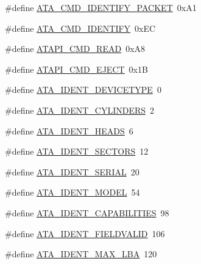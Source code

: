 \begin{DoxyCompactItemize}
\item 
\#define \hyperlink{a00032_acba68da9027d95b9bae53901a8ea009b_acba68da9027d95b9bae53901a8ea009b}{A\+T\+A\+\_\+\+C\+M\+D\+\_\+\+I\+D\+E\+N\+T\+I\+F\+Y\+\_\+\+P\+A\+C\+K\+ET}~0x\+A1
\item 
\#define \hyperlink{a00032_a572958103bba5d355c7fe135ae7526bd_a572958103bba5d355c7fe135ae7526bd}{A\+T\+A\+\_\+\+C\+M\+D\+\_\+\+I\+D\+E\+N\+T\+I\+FY}~0x\+EC
\item 
\#define \hyperlink{a00032_a46c7100054351e7afa8762a5dd165ff5_a46c7100054351e7afa8762a5dd165ff5}{A\+T\+A\+P\+I\+\_\+\+C\+M\+D\+\_\+\+R\+E\+AD}~0x\+A8
\item 
\#define \hyperlink{a00032_a94bf36a7e0a52f4dd421eca62e80631e_a94bf36a7e0a52f4dd421eca62e80631e}{A\+T\+A\+P\+I\+\_\+\+C\+M\+D\+\_\+\+E\+J\+E\+CT}~0x1B
\item 
\#define \hyperlink{a00032_a4224d2160f2f2718d8a67a09bfb8f4a5_a4224d2160f2f2718d8a67a09bfb8f4a5}{A\+T\+A\+\_\+\+I\+D\+E\+N\+T\+\_\+\+D\+E\+V\+I\+C\+E\+T\+Y\+PE}~0
\item 
\#define \hyperlink{a00032_a692fbddd7825db7edba694d647a69aa7_a692fbddd7825db7edba694d647a69aa7}{A\+T\+A\+\_\+\+I\+D\+E\+N\+T\+\_\+\+C\+Y\+L\+I\+N\+D\+E\+RS}~2
\item 
\#define \hyperlink{a00032_a1dcc2ec4b54df2f3cb011bbf6dc3795c_a1dcc2ec4b54df2f3cb011bbf6dc3795c}{A\+T\+A\+\_\+\+I\+D\+E\+N\+T\+\_\+\+H\+E\+A\+DS}~6
\item 
\#define \hyperlink{a00032_ae9be2cb739432bf835c6e5492cf92ba7_ae9be2cb739432bf835c6e5492cf92ba7}{A\+T\+A\+\_\+\+I\+D\+E\+N\+T\+\_\+\+S\+E\+C\+T\+O\+RS}~12
\item 
\#define \hyperlink{a00032_a60e929ababaf71de94d96c079f9028d0_a60e929ababaf71de94d96c079f9028d0}{A\+T\+A\+\_\+\+I\+D\+E\+N\+T\+\_\+\+S\+E\+R\+I\+AL}~20
\item 
\#define \hyperlink{a00032_a9fd52e892928c016a4a66f59a46241e4_a9fd52e892928c016a4a66f59a46241e4}{A\+T\+A\+\_\+\+I\+D\+E\+N\+T\+\_\+\+M\+O\+D\+EL}~54
\item 
\#define \hyperlink{a00032_a4efaa1ae14eb268a085d1824eb2a1f08_a4efaa1ae14eb268a085d1824eb2a1f08}{A\+T\+A\+\_\+\+I\+D\+E\+N\+T\+\_\+\+C\+A\+P\+A\+B\+I\+L\+I\+T\+I\+ES}~98
\item 
\#define \hyperlink{a00032_a4515f6ed07cf67add34766e02bd8d133_a4515f6ed07cf67add34766e02bd8d133}{A\+T\+A\+\_\+\+I\+D\+E\+N\+T\+\_\+\+F\+I\+E\+L\+D\+V\+A\+L\+ID}~106
\item 
\#define \hyperlink{a00032_ae0d046a29ce70e07d868961cf17b54c7_ae0d046a29ce70e07d868961cf17b54c7}{A\+T\+A\+\_\+\+I\+D\+E\+N\+T\+\_\+\+M\+A\+X\+\_\+\+L\+BA}~120

\end{DoxyCompactItemize}
